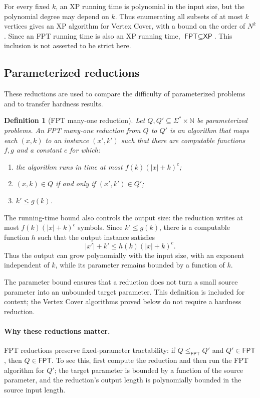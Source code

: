 \documentclass[11pt]{article}
\newtheorem{definition}[theorem]{Definition}
\newcommand{\FPT}{\textsf{FPT}}
\newcommand{\XP}{\textsf{XP}}
\begin{document}
For every fixed $k$, an XP running time is polynomial in the input size, but the polynomial degree may depend on $k$. Thus enumerating all subsets of at most $k$ vertices gives an XP algorithm for Vertex Cover, with a bound on the order of $N^k$. Since an FPT running time is also an XP running time, $\FPT\subseteq\XP$. This inclusion is not asserted to be strict here.

\subsection{Parameterized reductions}

These reductions are used to compare the difficulty of parameterized problems and to transfer hardness results.

\begin{definition}[FPT many-one reduction]
Let $Q,Q'\subseteq\Sigma^*\times\mathbb{N}$ be parameterized problems. An FPT many-one reduction from $Q$ to $Q'$ is an algorithm that maps each $(x,k)$ to an instance $(x',k')$ such that there are computable functions $f,g$ and a constant $c$ for which:
\begin{enumerate}
  \item the algorithm runs in time at most $f(k)(|x|+k)^c$;
  \item $(x,k)\in Q$ if and only if $(x',k')\in Q'$;
  \item $k'\leq g(k)$.
\end{enumerate}
\end{definition}

The running-time bound also controls the output size: the reduction writes at most $f(k)(|x|+k)^c$ symbols. Since $k'\leq g(k)$, there is a computable function $h$ such that the output instance satisfies
\[
|x'|+k'\leq h(k)(|x|+k)^c.
\]
Thus the output can grow polynomially with the input size, with an exponent independent of $k$, while its parameter remains bounded by a function of $k$.

The parameter bound ensures that a reduction does not turn a small source parameter into an unbounded target parameter. This definition is included for context; the Vertex Cover algorithms proved below do not require a hardness reduction.

\paragraph{Why these reductions matter.} FPT reductions preserve fixed-parameter tractability: if $Q\leq_{\FPT}Q'$ and $Q'\in\FPT$, then $Q\in\FPT$. To see this, first compute the reduction and then run the FPT algorithm for $Q'$; the target parameter is bounded by a function of the source parameter, and the reduction's output length is polynomially bounded in the source input length.
\end{document}
